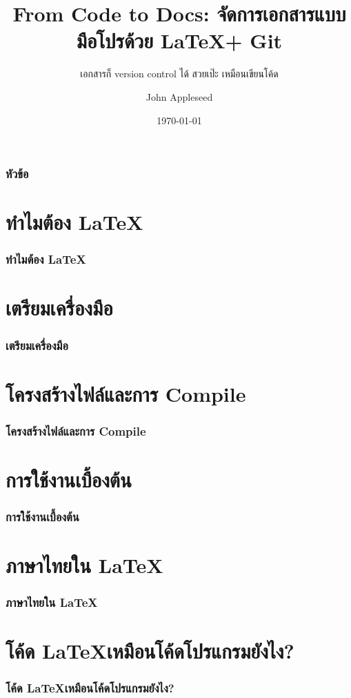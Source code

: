 \documentclass[xetex,serif,aspectratio=169]{beamer}
\title{From Code to Docs: จัดการเอกสารแบบมือโปรด้วย \LaTeX + Git}
\subtitle{เอกสารก็ version control ได้ สวยเป๊ะ เหมือนเขียนโค้ด}
\author{John Appleseed}
\institute[XUT]{มหาวิทยาลัยเทคโนโลยีซักแห่งหนึ่ง (XUT) }
\date{\today}
\begin{document}
\begin{frame}
    \maketitle
\end{frame}

\begin{frame}
    \frametitle{หัวข้อ}
    \tableofcontents
\end{frame}

\section{ทำไมต้อง \LaTeX}
\begin{frame}
    \frametitle{ทำไมต้อง \LaTeX}
\end{frame}

\section{เตรียมเครื่องมือ}
\begin{frame}
    \frametitle{เตรียมเครื่องมือ}
\end{frame}

\section{โครงสร้างไฟล์และการ Compile}
\begin{frame}
    \frametitle{โครงสร้างไฟล์และการ Compile}
\end{frame}

\section{การใช้งานเบื้องต้น}
\begin{frame}
    \frametitle{การใช้งานเบื้องต้น}
\end{frame}

\section{ภาษาไทยใน \LaTeX}
\begin{frame}
    \frametitle{ภาษาไทยใน \LaTeX}
\end{frame}

\section{โค้ด \LaTeX เหมือนโค้ดโปรแกรมยังไง?}
\begin{frame}
    \frametitle{โค้ด \LaTeX เหมือนโค้ดโปรแกรมยังไง?}
\end{frame}
\end{document}
